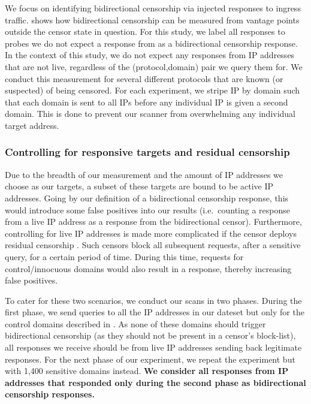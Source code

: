 We focus on identifying bidirectional censorship via injected responses to
ingress traffic. \textbf{} shows how bidirectional censorship can be measured from vantage points outside the censor state in question. For this study, we label all responses to probes we do not expect a response from as a bidirectional censorship response. In the context of this study, we do not expect any responses from IP addresses that are not live, regardless of the (protocol,domain) pair we query them for. We conduct this measurement for several different protocols that are known (or suspected) of being censored. For each experiment, we stripe IP by domain such that each domain is sent to all IPs before any individual IP is given a second domain. This is done to prevent our scanner from overwhelming any individual target address.


\subsubsection{Controlling for responsive targets and residual censorship}
Due to the breadth of our measurement and the amount of IP addresses we choose as our targets, a subset of these targets are bound to be active IP addresses. Going by our definition of a bidirectional censorship response, this would introduce some false positives into our results (i.e.\ counting a response from a live IP address as a response from the bidirectional censor). Furthermore, controlling for live IP addresses is made more complicated if the censor deploys residual censorship \cite{bock2021your}. Such censors block all subsequent requests, after a sensitive query, for a certain period of time. 
During this time, requests for control/innocuous domains would also result in a response, thereby increasing false positives.

To cater for these two scenarios, we conduct our scans in two phases. During the first phase, we send queries to all the IP addresses in our dateset but only for the control domains described in . As none of these domains should trigger bidirectional censorship (as they should not be present in a censor's block-list), all responses we receive should be from live IP addresses sending back legitimate responses. For the next phase of our experiment, we repeat the experiment but with 1,400 sensitive domains instead. \textbf{We consider all responses from IP addresses that responded only during the second phase as bidirectional censorship responses.}



